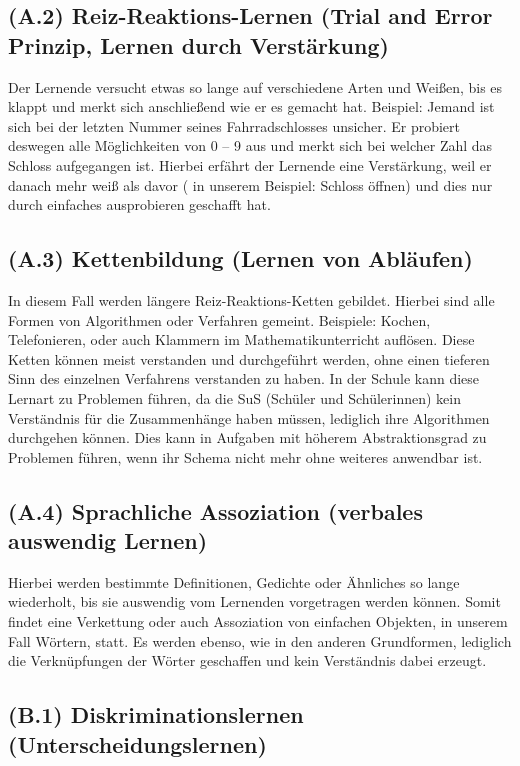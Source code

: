 \subsection[]{(A.2) Reiz-Reaktions-Lernen (Trial and Error Prinzip, Lernen durch Verstärkung)}

Der Lernende versucht etwas so lange auf verschiedene Arten und Weißen, bis es klappt und merkt sich anschließend wie er es gemacht hat. 
Beispiel: Jemand ist sich bei der letzten Nummer seines Fahrradschlosses unsicher. Er probiert deswegen  alle Möglichkeiten von 0 – 9 aus und merkt sich bei welcher Zahl das Schloss aufgegangen ist. Hierbei erfährt der Lernende eine Verstärkung, weil er danach mehr weiß als davor ( in unserem Beispiel: Schloss öffnen) und dies nur durch einfaches ausprobieren geschafft hat.

\subsection[]{(A.3) Kettenbildung (Lernen von Abläufen)}

In diesem Fall werden längere Reiz-Reaktions-Ketten gebildet. Hierbei sind alle Formen von Algorithmen oder Verfahren gemeint. Beispiele: Kochen, Telefonieren, oder auch Klammern im Mathematikunterricht auflösen. Diese Ketten können meist verstanden und durchgeführt werden, ohne einen tieferen Sinn des einzelnen Verfahrens verstanden zu haben. In der Schule kann diese Lernart zu Problemen führen, da die SuS (Schüler und Schülerinnen) kein Verständnis für die Zusammenhänge haben müssen, lediglich ihre Algorithmen durchgehen können. Dies kann in Aufgaben mit höherem Abstraktionsgrad zu Problemen führen, wenn ihr Schema nicht mehr ohne weiteres anwendbar ist.

\subsection[]{(A.4) Sprachliche Assoziation (verbales auswendig Lernen)}

Hierbei werden bestimmte Definitionen, Gedichte oder Ähnliches so lange wiederholt, bis sie auswendig vom Lernenden vorgetragen werden können. Somit findet eine Verkettung oder auch Assoziation von einfachen Objekten, in unserem Fall Wörtern, statt. Es werden ebenso, wie in den anderen Grundformen, lediglich die Verknüpfungen der Wörter geschaffen und kein Verständnis dabei erzeugt. 

\subsection[]{(B.1) Diskriminationslernen (Unterscheidungslernen)}

